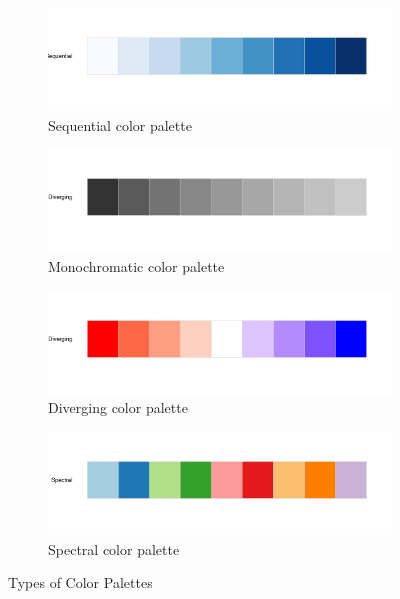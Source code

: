 \begin{figure}
\begin{subfigure}{\textwidth}
\centering
\includegraphics[width=.8\textwidth]{sequential.pdf}
\caption{Sequential color palette} 
\label{fig:sequential}
\end{subfigure}

\begin{subfigure}{\textwidth}
\centering
\includegraphics[width=.8\textwidth]{monochromatic.pdf}
\caption{Monochromatic color palette} 
\label{fig:monchromatic}
\end{subfigure}

\begin{subfigure}{\textwidth}
\centering
\includegraphics[width=.8\textwidth]{diverging.pdf}
\caption{Diverging color palette} 
\label{fig:diverging}
\end{subfigure}

\begin{subfigure}{\textwidth}
\centering
\includegraphics[width=.8\textwidth]{brewer.paired.pdf}
\caption{Spectral color palette} 
\label{fig:spectral}
\end{subfigure}

\caption{Types of Color Palettes}
\label{fig:palettes}
\end{figure}

